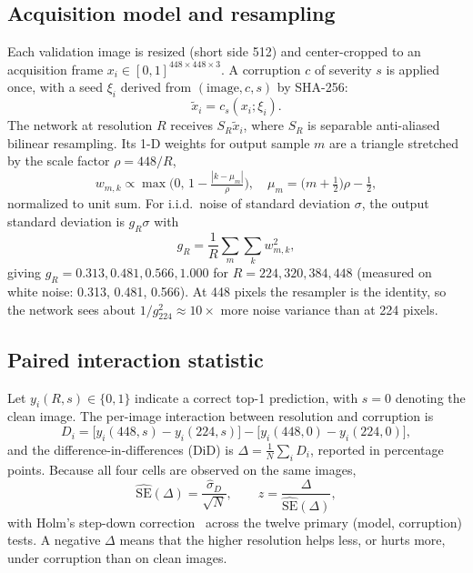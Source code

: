 \documentclass[conference]{IEEEtran}
\begin{document}
\subsection{Acquisition model and resampling}
Each validation image is resized (short side 512) and center-cropped to an acquisition frame $x_i\in[0,1]^{448\times448\times3}$. A corruption $c$ of severity $s$ is applied once, with a seed $\xi_i$ derived from $(\text{image},c,s)$ by SHA-256:
\begin{equation}
\tilde x_i = c_s(x_i;\xi_i).
\end{equation}
The network at resolution $R$ receives $S_R\tilde x_i$, where $S_R$ is separable anti-aliased bilinear resampling. Its 1-D weights for output sample $m$ are a triangle stretched by the scale factor $\rho=448/R$,
\begin{equation}
w_{m,k}\propto\max\!\Big(0,\,1-\tfrac{|k-\mu_m|}{\rho}\Big),\quad \mu_m=\big(m+\tfrac12\big)\rho-\tfrac12,
\end{equation}
normalized to unit sum. For i.i.d.\ noise of standard deviation $\sigma$, the output standard deviation is $g_R\sigma$ with
\begin{equation}
g_R=\frac{1}{R}\sum_{m}\sum_{k}w_{m,k}^2 ,
\end{equation}
giving $g_R=0.313,0.481,0.566,1.000$ for $R=224,320,384,448$ (measured on white noise: 0.313, 0.481, 0.566). At 448 pixels the resampler is the identity, so the network sees about $1/g_{224}^2\approx10\times$ more noise variance than at 224 pixels.

\subsection{Paired interaction statistic}
Let $y_i(R,s)\in\{0,1\}$ indicate a correct top-1 prediction, with $s=0$ denoting the clean image. The per-image interaction between resolution and corruption is
\begin{equation}
D_i=\big[y_i(448,s)-y_i(224,s)\big]-\big[y_i(448,0)-y_i(224,0)\big],\label{eq:did}
\end{equation}
and the difference-in-differences (DiD) is $\Delta=\frac1N\sum_iD_i$, reported in percentage points. Because all four cells are observed on the same images,
\begin{equation}
\widehat{\mathrm{SE}}(\Delta)=\frac{\hat\sigma_D}{\sqrt N},\qquad z=\frac{\Delta}{\widehat{\mathrm{SE}}(\Delta)},\label{eq:se}
\end{equation}
with Holm's step-down correction~\cite{holm1979} across the twelve primary (model, corruption) tests. A negative $\Delta$ means that the higher resolution helps less, or hurts more, under corruption than on clean images.
\end{document}
